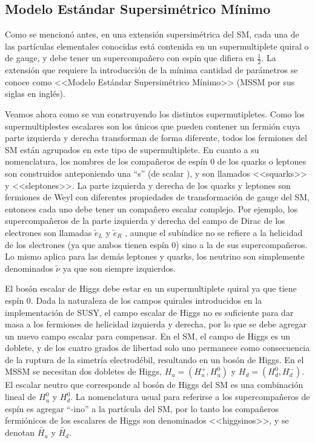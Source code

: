 \subsection{Modelo Estándar Supersimétrico Mínimo}

Como se mencionó antes, en una extensión supersimétrica del SM, cada una de las partículas elementales conocidas está contenida en un supermultiplete quiral o de gauge, y debe tener un supercompañero con espín que difiera en $\frac{1}{2}$. La extensión que requiere la introducción de la mínima cantidad de parámetros se conoce como <<Modelo Estándar Supersimétrico Mínimo>> (MSSM por sus siglas en inglés).

Veamos ahora como se van construyendo los distintos supermutipletes. Como los supermultiplestes escalares son los únicos que pueden contener un fermión cuya parte izquierda y derecha transforman de forma diferente, todos los fermiones del SM están agrupados en este tipo de supermultiplete. En cuanto a su nomenclatura, los nombres de los compañeros de espín 0 de los quarks o leptones son construidos anteponiendo una “s” (de scalar ), y son llamados <<squarks>> y <<sleptones>>. La parte izquierda y derecha de los quarks y leptones son fermiones de Weyl con diferentes propiedades de transformación de gauge del SM, entonces cada uno debe tener un compañero escalar complejo. Por ejemplo, los supercompañeros de la parte izquierda y derecha del campo de Dirac de los electrones son llamadas $\tilde{e}_{L}$ y $\tilde{e}_{R}$ , aunque el subíndice no se refiere a la helicidad de los slectrones (ya que ambos tienen espín 0) sino a la de sus supercompañeros. Lo mismo aplica para las demás leptones y quarks, los neutrino son simplemente denominados $\tilde{\nu}$ ya que son siempre izquierdos.

El bosón escalar de Higgs debe estar en un supermultiplete quiral ya que tiene espín 0. Dada la naturaleza de los campos quirales introducidos en la implementación de SUSY, el campo escalar de Higgs no es suficiente para dar masa a los fermiones de helicidad izquierda y derecha, por lo que se debe agregar un nuevo campo escalar para compensar. En el SM, el campo de Higgs es un doblete, y de los cuatro grados de libertad solo uno permanece como consecuencia de la ruptura de la simetría electrodébil, resultando en un bosón de Higgs. En el MSSM se necesitan dos dobletes de Higgs, $H_{u}=(H^{+}_{u},H^{0}_{u})$ y $H_{d}=(H^{0}_{d},H^{-}_{d})$. El escalar neutro que corresponde al bosón de Higgs del SM es una combinación lineal de $H^{0}_{u}$ y $H^{0}_{d}$. La nomenclatura usual para referirse a los supercompañeros de espín  es agregar “-ino” a la partícula del SM, por lo tanto los compañeros fermiónicos de los escalares de Higgs son denominados <<higgsinos>>, y se denotan $\widetilde{H_{u}}$ y $\widetilde{H_{d}}$.

